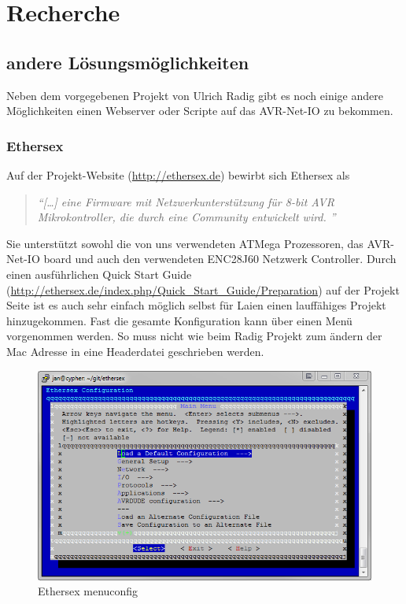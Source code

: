 \chapter{Recherche}

\section{andere Lösungsmöglichkeiten}

Neben dem vorgegebenen Projekt von Ulrich Radig gibt es noch einige andere
Möglichkeiten einen Webserver oder Scripte auf das AVR-Net-IO zu bekommen.

\subsection{Ethersex}

Auf der Projekt-Website (\url{http://ethersex.de}) bewirbt sich Ethersex als
\begin{quote} \textit{
		\enquote{[\ldots] eine Firmware mit Netzwerkunterstützung für 8-bit AVR
		Mikrokontroller, die durch eine Community entwickelt wird.  }
	}
	\cite{Ethersex}
\end{quote}

Sie unterstützt sowohl die von uns verwendeten ATMega Prozessoren, das
AVR-Net-IO board und auch den verwendeten ENC28J60 Netzwerk Controller.
Durch einen ausführlichen Quick Start Guide
(\url{http://ethersex.de/index.php/Quick_Start_Guide/Preparation}) auf der
Projekt Seite ist es auch sehr einfach möglich selbst für Laien einen
lauffähiges Projekt hinzugekommen. Fast die gesamte Konfiguration kann
über einen Menü vorgenommen werden. So muss nicht wie beim Radig Projekt zum
ändern der Mac Adresse in eine Headerdatei geschrieben werden. 

\begin{figure}[H]
	\centering
		\includegraphics[width=13cm]{content/pictures/Recherche/Ethersex/Ehtersex1.png}
	\caption{Ethersex menuconfig}
	\label{Ethersex1}
\end{figure} 

